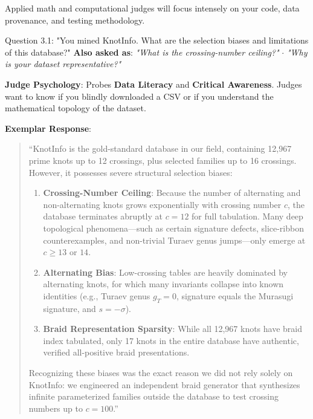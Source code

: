 \documentclass[11pt,letterpaper]{article}
\begin{document}
Applied math and computational judges will focus intensely on your code, data provenance, and testing methodology.

\begin{questionbox}{Question 3.1: "You mined KnotInfo. What are the selection biases and limitations of this database?"}
\textbf{Also asked as}: \textit{"What is the crossing-number ceiling?"} $\cdot$ \textit{"Why is your dataset representative?"}
\end{questionbox}

\begin{strategybox}
\textbf{Judge Psychology}: Probes \textbf{Data Literacy} and \textbf{Critical Awareness}. Judges want to know if you blindly downloaded a CSV or if you understand the mathematical topology of the dataset.
\end{strategybox}

\begin{exemplarbox}
\textbf{Exemplar Response}:
\begin{quote}
``KnotInfo is the gold-standard database in our field, containing 12,967 prime knots up to 12 crossings, plus selected families up to 16 crossings. However, it possesses severe structural selection biases:
\begin{enumerate}
    \item \textbf{Crossing-Number Ceiling}: Because the number of alternating and non-alternating knots grows exponentially with crossing number $c$, the database terminates abruptly at $c=12$ for full tabulation. Many deep topological phenomena---such as certain signature defects, slice-ribbon counterexamples, and non-trivial Turaev genus jumps---only emerge at $c \geq 13$ or $14$.
    \item \textbf{Alternating Bias}: Low-crossing tables are heavily dominated by alternating knots, for which many invariants collapse into known identities (e.g., Turaev genus $g_T = 0$, signature equals the Murasugi signature, and $s = -\sigma$).
    \item \textbf{Braid Representation Sparsity}: While all 12,967 knots have braid index tabulated, only 17 knots in the entire database have authentic, verified all-positive braid presentations.
\end{enumerate}
Recognizing these biases was the exact reason we did not rely solely on KnotInfo: we engineered an independent braid generator that synthesizes infinite parameterized families outside the database to test crossing numbers up to $c=100$.''
\end{quote}
\end{exemplarbox}
\end{document}
